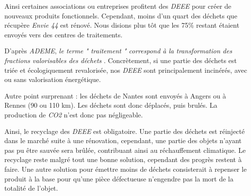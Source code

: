 \bigbreak

Ainsi certaines associations ou entreprises profitent des \textit{DEEE} pour créer de nouveaux produits fonctionnels. Cependant, moins d'un quart des déchets que récupère \textit{Envie 44} est rénové. Nous disions plus tôt que les 75\% restant étaient envoyés vers  des centres de traitements. 

D'après \textit{ADEME}\cite{ADEME_unite_traitement}, \og \textit{le terme " traitement " correspond à la transformation des fractions valorisables des déchets}  \fg{}. Concrètement, si une partie des déchets est triée et écologiquement revalorisée, nos \textit{DEEE} sont principalement incinérés, avec ou sans valorisation énergétique. 

Autre point surprenant : les déchets de Nantes sont envoyés à Angers ou à Rennes (90 ou 110 km).   Les déchets sont donc déplacés, puis brulés. La production de \textit{CO2} n'est donc pas négligeable. 

\bigbreak

Ainsi, le recyclage des \textit{DEEE} est obligatoire. Une partie des déchets est réinjecté dans le marché suite à une rénovation, cependant, une partie des objets n'ayant pas pu être sauvée sera brûlée, contribuant ainsi au réchauffement climatique. Le recyclage reste malgré tout une bonne solution, cependant des progrès restent à faire. 
\medbreak
Une autre solution pour émettre moins de déchets consisterait à repenser le produit à la base pour qu'une pièce défectueuse n'engendre pas la mort de la totalité de l'objet. 
